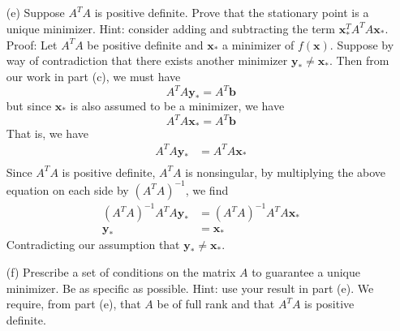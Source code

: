 \documentclass{article}
\begin{document}
\begin{itemize}
\begin{itemize}
        \item[(e)] Suppose $A^TA$ is positive definite. Prove that the stationary point is a unique minimizer. Hint: consider adding and subtracting the term $\mathbf{x}_*^TA^TA\mathbf{x}_*$.
        \newline\newline
        Proof: Let $A^TA$ be positive definite and $\mathbf{x}_*$ a minimizer of $f(\mathbf{x})$. Suppose by way of contradiction that there exists another minimizer $\mathbf{y}_* \neq \mathbf{x}_*$. Then from our work in part (c), we must have
        \[A^TA\mathbf{y}_* = A^T\mathbf{b}\]
        but since $\mathbf{x}_*$ is also assumed to be a minimizer, we have
        \[A^TA\mathbf{x}_* = A^T\mathbf{b}\]
        That is, we have
        \begin{align*}
            A^TA\mathbf{y}_* &= A^TA\mathbf{x}_* \\
        \end{align*}
        Since $A^TA$ is positive definite, $A^TA$ is nonsingular, by multiplying the above equation on each side by $(A^TA)^{-1}$, we find
        \begin{align*}
            (A^TA)^{-1}A^TA\mathbf{y}_* &= (A^TA)^{-1}A^TA\mathbf{x}_*\\
            \mathbf{y}_* &= \mathbf{x}_*
        \end{align*}
        Contradicting our assumption that $\mathbf{y}_* \neq \mathbf{x}_*$.
        

        \item[(f)] Prescribe a set of conditions on the matrix $A$ to guarantee a unique minimizer. Be as specific as possible. Hint: use your result in part (e).
        \newline\newline
        We require, from part (e), that $A$ be of full rank and that $A^TA$ is positive definite.
        
        
    \end{itemize}


\end{itemize}
\end{document}
